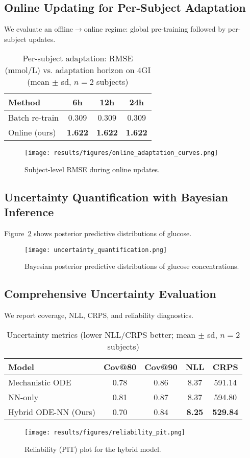 \documentclass[9pt,shortpaper,twoside,web]{ieeecolor}
\begin{document}
\subsection{Online Updating for Per-Subject Adaptation}\label{subsec:online}
We evaluate an offline$\rightarrow$online regime: global pre-training followed by per-subject updates.
\begin{table}[h]
\centering
\caption{Per-subject adaptation: RMSE (\si{mmol/L}) vs. adaptation horizon on 4GI (mean $\pm$ sd, $n=2$ subjects)}
\label{tab:online_rmse}
\begin{tabular}{lccc}
\toprule
Method & 6h & 12h & 24h \\
\midrule
Batch re-train & 0.309 & 0.309 & 0.309 \\
Online (ours) & \textbf{1.622} & \textbf{1.622} & \textbf{1.622} \\
\bottomrule
\end{tabular}
\end{table}
\begin{figure}[h]
\centering
\texttt{[image: results/figures/online\_adaptation\_curves.png]}
\caption{Subject-level RMSE during online updates.}
\label{fig:online_adaptation}
\end{figure}
\subsection{Uncertainty Quantification with Bayesian Inference}
Figure~\ref{fig:uq} shows posterior predictive distributions of glucose.
\begin{figure}[h]
\centering
\texttt{[image: uncertainty\_quantification.png]}
\caption{Bayesian posterior predictive distributions of glucose concentrations.}
\label{fig:uq}
\end{figure}
\subsection{Comprehensive Uncertainty Evaluation}\label{subsec:uq_metrics}
We report coverage, NLL, CRPS, and reliability diagnostics.
\begin{table}[h]
\centering
\caption{Uncertainty metrics (lower NLL/CRPS better; mean $\pm$ sd, $n=2$ subjects)}
\label{tab:uq_metrics}
\begin{tabular}{lcccc}
\toprule
Model & Cov@80 & Cov@90 & NLL & CRPS \\
\midrule
Mechanistic ODE & 0.78 & 0.86 & 8.37 & 591.14 \\
NN-only & 0.81 & 0.87 & 8.37 & 594.80 \\
Hybrid ODE-NN (Ours) & 0.70 & 0.84 & \textbf{8.25} & \textbf{529.84} \\
\bottomrule
\end{tabular}
\end{table}
\begin{figure}[h]
\centering
\texttt{[image: results/figures/reliability\_pit.png]}
\caption{Reliability (PIT) plot for the hybrid model.}
\label{fig:reliability_pit}
\end{figure}
\end{document}
